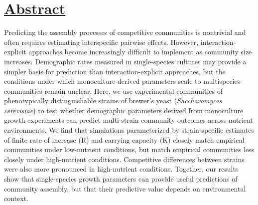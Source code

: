 
\section*{\textbf{\underline{Abstract}}}
Predicting the assembly processes of competitive communities is nontrivial and often requires estimating interspecific pairwise effects. However, interaction-explicit approaches become increasingly difficult to implement as community size increases. Demographic rates measured in single-species cultures may provide a simpler basis for prediction than interaction-explicit approaches, but the conditions under which monoculture-derived parameters scale to multispecies communities remain unclear. Here, we use experimental communities of phenotypically distinguishable strains of brewer's yeast (\textit{Saccharomyces cerevisiae}) to test whether demographic parameters derived from monoculture growth experiments can predict multi-strain community outcomes across nutrient environments. We find that simulations parameterized by strain-specific estimates of finite rate of increase (R) and carrying capacity (K) closely match empirical communities under low-nutrient conditions, but match empirical communities less closely under high-nutrient conditions. Competitive differences between strains were also more pronounced in high-nutrient conditions. Together, our results show that single-species growth parameters can provide useful predictions of community assembly, but that their predictive value depends on environmental context. 





